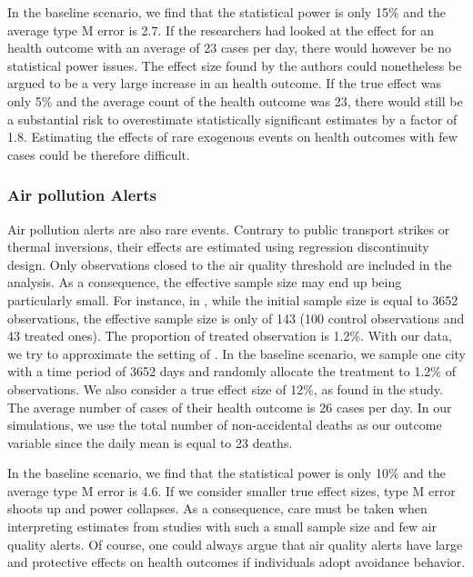 \documentclass[12pt]{article}
\begin{document}
            In the baseline scenario, we find that the statistical power is only 15\% and the average type M error is 2.7. If the researchers had looked at the effect for an health outcome with an average of 23 cases per day, there would however be no statistical power issues. The effect size found by the authors could nonetheless be argued to be a very large increase in an health outcome. If the true effect was only 5\% and the average count of the health outcome was 23, there would still be a substantial risk to overestimate statistically significant estimates by a factor of 1.8. Estimating the effects of rare exogenous events on health outcomes with few cases could be therefore difficult.
        
        \subsubsection*{Air pollution Alerts}
        
            Air pollution alerts are also rare events. Contrary to public transport strikes or thermal inversions, their effects are estimated using regression discontinuity design. Only observations closed to the air quality threshold are included in the analysis. As a consequence, the effective sample size may end up being particularly small. For instance, in \cite{chen_effect_2018}, while the initial sample size is equal to 3652 observations, the effective sample size is only of 143 (100 control observations and 43 treated ones). The proportion of treated observation is 1.2\%. With our data, we try to approximate the setting of \cite{chen_effect_2018}. In the baseline scenario, we sample one city with a time period of 3652 days and randomly allocate the treatment to 1.2\% of observations. We also consider a true effect size of 12\%, as found in the study. The average number of cases of their health outcome is 26 cases per day. In our simulations, we use the total number of non-accidental deaths as our outcome variable since the daily mean is equal to 23 deaths.
            
           In the baseline scenario, we find that the statistical power is only 10\% and the average type M error is 4.6. If we consider smaller true effect sizes, type M error shoots up and power collapses. As a consequence, care must be taken when interpreting estimates from studies with such a small sample size and few air quality alerts. Of course, one could always argue that air quality alerts have large and protective effects on health outcomes if individuals adopt avoidance behavior.
            
\end{document}
